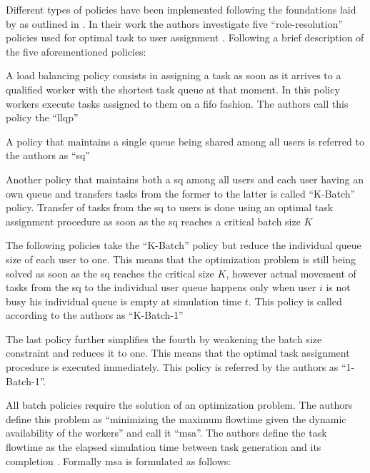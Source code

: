 \documentclass[draft=false]{seal_thesis}
\begin{document}
Different types of policies have been implemented following the foundations laid by \citet{Zeng2005} as outlined in . In their work the authors investigate five ``role-resolution'' policies used for optimal task to user assignment \citep[p. 7]{Zeng2005}. Following a brief description of the five aforementioned policies:
\begin{enumerate*}
	\item A load balancing policy consists in assigning a task as soon as it arrives to a qualified worker with the shortest task queue at that moment. In this policy workers execute tasks assigned to them on a \gls{fifo} fashion. The authors call this policy the ``\gls{llqp}''
	\item A policy that maintains a single queue being shared among all users is referred to the authors as ``\gls{sq}''
	\item Another policy that maintains both a \gls{sq} among all users and each user having an own queue and transfers tasks from the former to the latter is called ``K-Batch'' policy. Transfer of tasks from the \gls{sq} to users is done using an optimal task assignment procedure as soon as the \gls{sq} reaches a critical batch size $K$
	\item The following policies take the ``K-Batch'' policy but reduce the individual queue size of each user to one. This means that the optimization problem is still being solved as soon as the \gls{sq} reaches the critical size $K$, however actual movement of tasks from the \gls{sq} to the individual user queue happens only when user $i$ is not busy \ie his individual queue is empty at simulation time $t$. This policy is called according to the authors as ``K-Batch-1''
	\item The last policy further simplifies the fourth by weakening the batch size constraint and reduces it to one. This means that the optimal task assignment procedure is executed immediately. This policy is referred by the authors as ``1-Batch-1''.
\end{enumerate*}

All batch policies require the solution of an optimization problem. The authors define this problem as ``minimizing the maximum flowtime given the dynamic availability of the workers'' and call it ``\gls{msa}''\citep[p. 7]{Zeng2005}. The authors define the task flowtime as the elapsed simulation time between task generation and its completion \citep{Zeng2005,Baker1974}. Formally \gls{msa} is formulated as follows:
\end{document}
